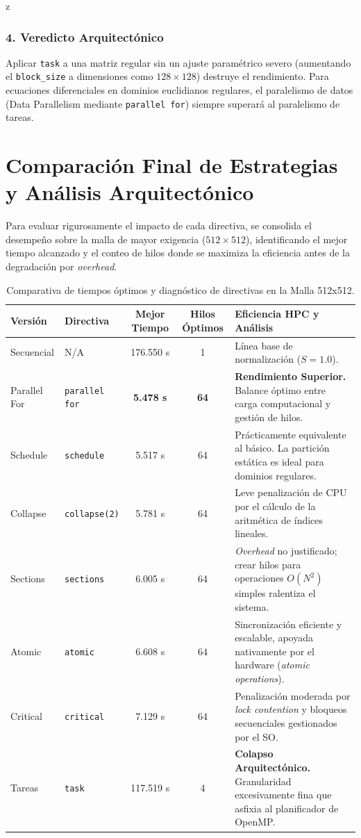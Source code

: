 z\documentclass[11pt,a4paper]{article}
\begin{document}
\subsubsection*{4. Veredicto Arquitectónico}
Aplicar \texttt{task} a una matriz regular sin un ajuste paramétrico severo (aumentando el \texttt{block\_size} a dimensiones como $128 \times 128$) destruye el rendimiento. Para ecuaciones diferenciales en dominios euclidianos regulares, el paralelismo de datos (Data Parallelism mediante \texttt{parallel for}) siempre superará al paralelismo de tareas.

\section*{Comparación Final de Estrategias y Análisis Arquitectónico}

Para evaluar rigurosamente el impacto de cada directiva, se consolida el desempeño sobre la malla de mayor exigencia ($512 \times 512$), identificando el mejor tiempo alcanzado y el conteo de hilos donde se maximiza la eficiencia antes de la degradación por \textit{overhead}.

\begin{table}[H]
\centering
\renewcommand{\arraystretch}{1.3}
\begin{tabularx}{\textwidth}{l l c c X}
\toprule
\textbf{Versión} & \textbf{Directiva} & \textbf{Mejor Tiempo} & \textbf{Hilos Óptimos} & \textbf{Eficiencia HPC y Análisis} \\
\midrule
Secuencial & N/A & 176.550 s & 1 & Línea base de normalización ($S=1.0$). \\
Parallel For & \texttt{parallel for} & \textbf{5.478 s} & \textbf{64} & \textbf{Rendimiento Superior.} Balance óptimo entre carga computacional y gestión de hilos. \\
Schedule & \texttt{schedule} & 5.517 s & 64 & Prácticamente equivalente al básico. La partición estática es ideal para dominios regulares. \\
Collapse & \texttt{collapse(2)} & 5.781 s & 64 & Leve penalización de CPU por el cálculo de la aritmética de índices lineales. \\
Sections & \texttt{sections} & 6.005 s & 64 & \textit{Overhead} no justificado; crear hilos para operaciones $O(N^2)$ simples ralentiza el sistema. \\
Atomic & \texttt{atomic} & 6.608 s & 64 & Sincronización eficiente y escalable, apoyada nativamente por el hardware (\textit{atomic operations}). \\
Critical & \texttt{critical} & 7.129 s & 64 & Penalización moderada por \textit{lock contention} y bloqueos secuenciales gestionados por el SO. \\
Tareas & \texttt{task} & 117.519 s & 4 & \textbf{Colapso Arquitectónico.} Granularidad excesivamente fina que asfixia al planificador de OpenMP. \\
\bottomrule
\end{tabularx}
\caption{Comparativa de tiempos óptimos y diagnóstico de directivas en la Malla 512x512.}
\label{tab:comparativa_final}
\end{table}
\end{document}

